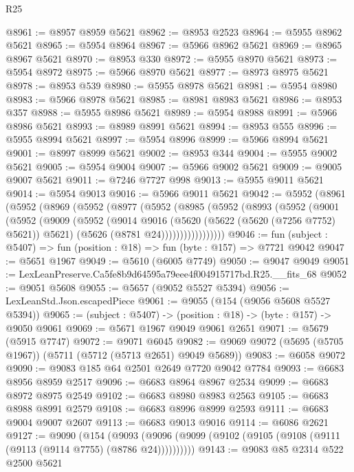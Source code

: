 \begin{lexlean}{R25}
\begin{coremodule}
@8961 := @8957 @8959 @5621
@8962 := @8953 @2523
@8964 := @5955 @8962 @5621
@8965 := @5954 @8964
@8967 := @5966 @8962 @5621
@8969 := @8965 @8967 @5621
@8970 := @8953 @330
@8972 := @5955 @8970 @5621
@8973 := @5954 @8972
@8975 := @5966 @8970 @5621
@8977 := @8973 @8975 @5621
@8978 := @8953 @539
@8980 := @5955 @8978 @5621
@8981 := @5954 @8980
@8983 := @5966 @8978 @5621
@8985 := @8981 @8983 @5621
@8986 := @8953 @357
@8988 := @5955 @8986 @5621
@8989 := @5954 @8988
@8991 := @5966 @8986 @5621
@8993 := @8989 @8991 @5621
@8994 := @8953 @555
@8996 := @5955 @8994 @5621
@8997 := @5954 @8996
@8999 := @5966 @8994 @5621
@9001 := @8997 @8999 @5621
@9002 := @8953 @344
@9004 := @5955 @9002 @5621
@9005 := @5954 @9004
@9007 := @5966 @9002 @5621
@9009 := @9005 @9007 @5621
@9011 := @7246 @7727 @998
@9013 := @5955 @9011 @5621
@9014 := @5954 @9013
@9016 := @5966 @9011 @5621
@9042 := @5952
    (@8961
      (@5952
        (@8969
          (@5952
            (@8977
              (@5952
                (@8985
                  (@5952
                    (@8993
                      (@5952
                        (@9001
                          (@5952
                            (@9009
                              (@5952
                                (@9014
                                  @9016
                                  (@5620 (@5622 (@5620 (@7256 @7752) @5621)) @5621)
                                  (@5626 (@8781 @24)))))))))))))))))
@9046 := fun (subject : @5407) => fun (position : @18) => fun (byte : @157) => @7721 @9042
@9047 := @5651 @1967
@9049 := @5610 (@6005 @7749)
@9050 := @9047 @9049
@9051 := LexLeanPreserve.Ca5fe8b9d64595a79eee4f004915717bd.R25.__fits_68
@9052 := @9051 @5608
@9055 := @5657 (@9052 @5527 @5394)
@9056 := LexLeanStd.Json.escapedPiece
@9061 := @9055 (@154 (@9056 @5608 @5527 @5394))
@9065 := (subject : @5407) -> (position : @18) -> (byte : @157) -> @9050 @9061
@9069 := @5671 @1967 @9049 @9061 @2651
@9071 := @5679 (@5915 @7747)
@9072 := @9071 @6045
@9082 := @9069 @9072 (@5695 (@5705 @1967)) (@5711 (@5712 (@5713 @2651) @9049 @5689))
@9083 := @6058 @9072
@9090 := @9083 @185 @64 @2501 @2649 @7720 @9042 @7784
@9093 := @6683 @8956 @8959 @2517
@9096 := @6683 @8964 @8967 @2534
@9099 := @6683 @8972 @8975 @2549
@9102 := @6683 @8980 @8983 @2563
@9105 := @6683 @8988 @8991 @2579
@9108 := @6683 @8996 @8999 @2593
@9111 := @6683 @9004 @9007 @2607
@9113 := @6683 @9013 @9016
@9114 := @6086 @2621
@9127 := @9090
    (@154 (@9093 (@9096 (@9099 (@9102 (@9105 (@9108 (@9111 (@9113 (@9114 @7755) (@8786 @24))))))))))
@9143 := @9083
    @85
    @2314
    @522
    @2500
    @5621

\end{coremodule}
\end{lexlean}
